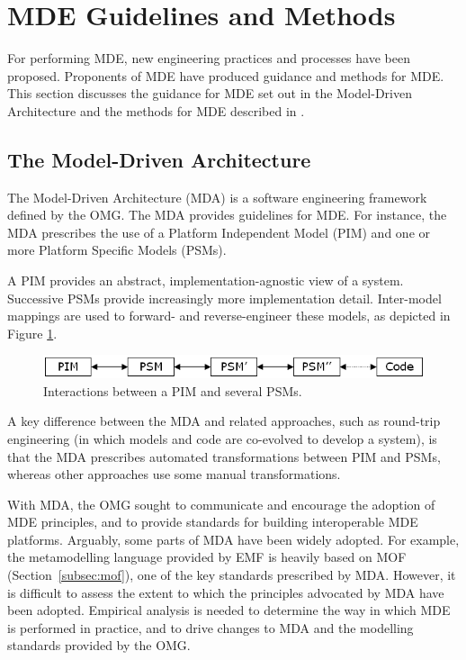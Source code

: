 
\section{MDE Guidelines and Methods}
\label{sec:mde_methods}
For performing MDE, new engineering practices and processes have been proposed. Proponents of MDE have produced guidance and methods for MDE. This section discusses the guidance for MDE set out in the Model-Driven Architecture \cite{mda} and the methods for MDE described in \cite{stahl06mdsd,kelly08dsm,greenfield04software}. 

\subsection{The Model-Driven Architecture}
The Model-Driven Architecture (MDA) is a software engineering framework defined by the OMG. The MDA provides guidelines for MDE. For instance, the MDA prescribes the use of a Platform Independent Model (PIM) and one or more Platform Specific Models (PSMs).

A PIM provides an abstract, implementation-agnostic view of a system. Successive PSMs provide increasingly more implementation detail. Inter-model mappings are used to forward- and reverse-engineer these models, as depicted in
Figure \ref{fig:mda}.

\begin{figure}[htbp]
  \begin{center}
    \leavevmode
    \includegraphics[scale=0.5]{2.Background/images/PIMs_and_PSMs.png}
  \end{center}
  \caption{Interactions between a PIM and several PSMs.}
  \label{fig:mda}
\end{figure}

A key difference between the MDA and related approaches, such as round-trip engineering (in which models and code are co-evolved to develop a system), is that the MDA prescribes automated transformations between PIM and PSMs, whereas other approaches use some manual transformations.

With MDA, the OMG sought to communicate and encourage the adoption of MDE principles, and to provide standards for building interoperable MDE platforms. Arguably, some parts of MDA have been widely adopted. For example, the metamodelling language provided by EMF is heavily based on MOF (Section~\ref{subsec:mof}), one of the key standards prescribed by MDA. However, it is difficult to assess the extent to which the principles advocated by MDA have been adopted. Empirical analysis is needed to determine the way in which MDE is performed in practice, and to drive changes to MDA and the modelling standards provided by the OMG.

